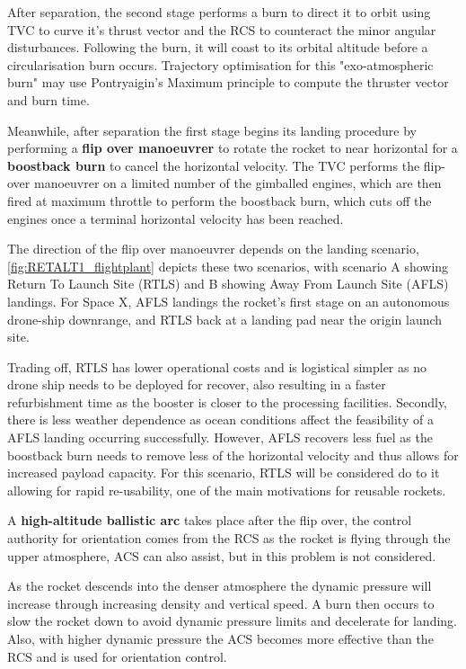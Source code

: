 After separation, the second stage performs a burn to direct it to orbit using TVC to curve it's thrust vector and the RCS to counteract the minor angular disturbances. Following the burn, it will coast to its orbital altitude before a circularisation burn occurs. Trajectory optimisation for this "exo-atmospheric burn" may use Pontryaigin's Maximum principle to compute the thruster vector and burn time.

Meanwhile, after separation the first stage begins its landing procedure by performing a \textbf{flip over manoeuvrer} to rotate the rocket to near horizontal for a \textbf{boostback burn} to cancel the horizontal velocity. The TVC performs the flip-over manoeuvrer on a limited number of the gimballed engines, which are then fired at maximum throttle to perform the boostback burn, which cuts off the engines once a terminal horizontal velocity has been reached.

The direction of the flip over manoeuvrer depends on the landing scenario, \autoref{fig:RETALT1_flightplant} depicts these two scenarios, with scenario A showing  Return To Launch Site (RTLS) and B showing Away From Launch Site (AFLS) landings. For Space X, AFLS landings the rocket's first stage on an autonomous drone-ship downrange, and RTLS back at a landing pad near the origin launch site.

Trading off, RTLS has lower operational costs and is logistical simpler as no drone ship needs to be deployed for recover, also resulting in a faster refurbishment time as the booster is closer to the processing facilities. Secondly, there is less weather dependence as ocean conditions affect the feasibility of a AFLS landing occurring successfully. However, AFLS recovers less fuel as the boostback burn needs to remove less of the horizontal velocity and thus allows for increased payload capacity. For this scenario, RTLS will be considered do to it allowing for rapid re-usability, one of the main motivations for reusable rockets.

A \textbf{high-altitude ballistic arc} takes place after the flip over, the control authority for orientation comes from the RCS as the rocket is flying through the upper atmosphere, ACS can also assist, but in this problem is not considered.

As the rocket descends into the denser atmosphere the dynamic pressure will increase through increasing density and vertical speed. A burn then occurs to slow the rocket down to avoid dynamic pressure limits and decelerate for landing. Also, with higher dynamic pressure the ACS becomes more effective than the RCS and is used for orientation control.

